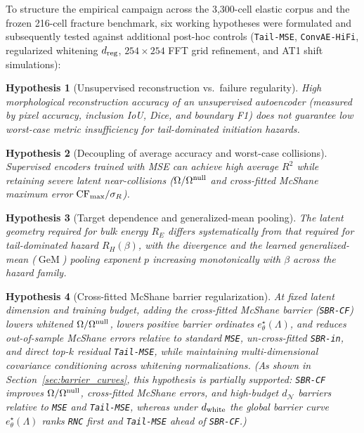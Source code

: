 \documentclass[preprint,11pt,a4paper]{elsarticle}
\newtheorem{hypothesis}{Hypothesis}
\newcommand{\GeM}{\operatorname{GeM}}
\begin{document}
To structure the empirical campaign across the 3,300-cell elastic corpus and the frozen 216-cell fracture benchmark, six working hypotheses were formulated and subsequently tested against additional post-hoc controls (\texttt{Tail-MSE}, \texttt{ConvAE-HiFi}, regularized whitening $d_{\rm reg}$, $254\times 254$ FFT grid refinement, and AT1 shift simulations):

\begin{hypothesis}[Unsupervised reconstruction vs.\ failure regularity]
\label{hyp:recon}
High morphological reconstruction accuracy of an unsupervised autoencoder (measured by pixel accuracy, inclusion IoU, Dice, and boundary F1) does not guarantee low worst-case metric insufficiency for tail-dominated initiation hazards.
\end{hypothesis}

\begin{hypothesis}[Decoupling of average accuracy and worst-case collisions]
\label{hyp:avg}
Supervised encoders trained with MSE can achieve high average $R^2$ while retaining severe latent near-collisions ($\Omega/\Omega^{\rm null}$ and cross-fitted McShane maximum error ${\rm CF}_{\max}/\sigma_R$).
\end{hypothesis}

\begin{hypothesis}[Target dependence and generalized-mean pooling]
\label{hyp:target}
The latent geometry required for bulk energy $R_E$ differs systematically from that required for tail-dominated hazard $R_H(\beta)$, with the divergence and the learned generalized-mean ($\GeM$) pooling exponent $p$ increasing monotonically with $\beta$ across the hazard family.
\end{hypothesis}

\begin{hypothesis}[Cross-fitted McShane barrier regularization]
\label{hyp:cf}
At fixed latent dimension and training budget, adding the cross-fitted McShane barrier (\texttt{SBR-CF}) lowers whitened $\Omega/\Omega^{\rm null}$, lowers positive barrier ordinates $e^\star_\theta(\Lambda)$, and reduces out-of-sample McShane errors relative to standard \texttt{MSE}, un-cross-fitted \texttt{SBR-in}, and direct top-$k$ residual \texttt{Tail-MSE}, while maintaining multi-dimensional covariance conditioning across whitening normalizations. \emph{(As shown in Section~\ref{sec:barrier_curves}, this hypothesis is partially supported: \texttt{SBR-CF} improves $\Omega/\Omega^{\rm null}$, cross-fitted McShane errors, and high-budget $d_{\mathcal N}$ barriers relative to \texttt{MSE} and \texttt{Tail-MSE}, whereas under $d_{\rm white}$ the global barrier curve $e^\star_\theta(\Lambda)$ ranks \texttt{RNC} first and \texttt{Tail-MSE} ahead of \texttt{SBR-CF}.)}
\end{hypothesis}
\end{document}
